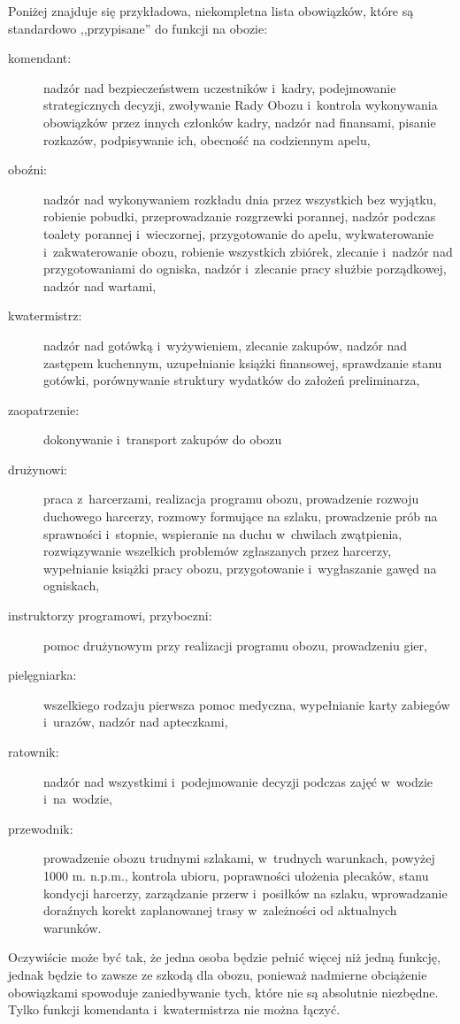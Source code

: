 \documentclass[a5paper,10pt,titlepage,twoside]{article}
\begin{document}
Poniżej znajduje się przykładowa, niekompletna lista obowiązków, które są standardowo ,,przypisane'' do funkcji na obozie:
\begin{description}
\item[komendant:] nadzór nad bezpieczeństwem uczestników i~kadry, podejmowanie strategicznych decyzji, zwoływanie Rady Obozu i~kontrola wykonywania obowiązków przez innych członków kadry, nadzór nad finansami, pisanie rozkazów, podpisywanie ich, obecność na codziennym apelu,
\item[oboźni:] nadzór nad wykonywaniem rozkładu dnia przez wszystkich bez wyjątku, robienie pobudki, przeprowadzanie rozgrzewki porannej, nadzór podczas toalety porannej i~wieczornej, przygotowanie do apelu, wykwaterowanie i~zakwaterowanie obozu, robienie wszystkich zbiórek, zlecanie i~nadzór nad przygotowaniami do ogniska, nadzór i~zlecanie pracy służbie porządkowej, nadzór nad wartami,
\item[kwatermistrz:] nadzór nad gotówką i~wyżywieniem, zlecanie zakupów, nadzór nad zastępem kuchennym, uzupełnianie książki finansowej, sprawdzanie stanu gotówki, porównywanie struktury wydatków do założeń preliminarza,
\item[zaopatrzenie:] dokonywanie i~transport zakupów do obozu
\item[drużynowi:] praca z~harcerzami, realizacja programu obozu, prowadzenie rozwoju duchowego harcerzy, rozmowy formujące na szlaku, prowadzenie prób na sprawności i~stopnie, wspieranie na duchu w~chwilach zwątpienia, rozwiązywanie wszelkich problemów zgłaszanych przez harcerzy, wypełnianie książki pracy obozu, przygotowanie i~wygłaszanie gawęd na ogniskach,
\item[instruktorzy programowi, przyboczni:] pomoc drużynowym przy realizacji programu obozu, prowadzeniu gier,
\item[pielęgniarka:] wszelkiego rodzaju pierwsza pomoc medyczna, wypełnianie karty zabiegów i~urazów, nadzór nad apteczkami,
\item[ratownik:] nadzór nad wszystkimi i~podejmowanie decyzji podczas zajęć w~wodzie i~na~wodzie,
\item[przewodnik:] prowadzenie obozu trudnymi szlakami, w~trudnych warunkach, powyżej 1000 m. n.p.m., kontrola ubioru, poprawności ułożenia plecaków, stanu kondycji harcerzy, zarządzanie przerw i~posiłków na szlaku, wprowadzanie doraźnych korekt zaplanowanej trasy w~zależności od aktualnych warunków.
\end{description}
Oczywiście może być tak, że jedna osoba będzie pełnić więcej niż jedną funkcję, jednak będzie to zawsze ze szkodą dla obozu, ponieważ nadmierne obciążenie obowiązkami spowoduje zaniedbywanie tych, które nie są absolutnie niezbędne. Tylko funkcji komendanta i~kwatermistrza nie można łączyć.
\end{document}
